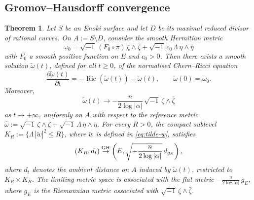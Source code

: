 \documentclass[12pt]{amsart}
\numberwithin{equation}{section}
\newtheorem{theorem}{Theorem}
\theoremstyle{remark}
\theoremstyle{definition}
\begin{document}
\subsection{Gromov--Hausdorff convergence}

\begin{theorem}\label{thm:crf-enoki}
Let $S$ be an Enoki surface and let $D$ be its maximal reduced divisor of rational curves. On $A:=S\setminus D$, consider the smooth Hermitian metric
$$ \omega_0 = \sqrt{-1}\,(F_0\circ\pi)\,\zeta\wedge\bar\zeta+\sqrt{-1}\,c_0\,\Lambda\,\eta\wedge\bar\eta $$
with $F_0$ a smooth positive function on $E$ and $c_0>0$. Then there exists a smooth solution $\tilde\omega(t)$, defined for all $t\geq0$, of the normalised Chern--Ricci equation
$$
\frac{\partial\tilde\omega(t)}{\partial t}
=
-\operatorname{Ric}(\tilde\omega(t))-\tilde\omega(t),
\qquad
\tilde\omega(0)=\omega_0.
$$
Moreover,
$$ \tilde\omega(t) \to -\frac{n}{2\log|\alpha|}\,\sqrt{-1}\,\zeta\wedge\bar\zeta $$
as $t\to+\infty$, uniformly on $A$ with respect to the reference metric $\hat\omega:=\sqrt{-1}\,\zeta\wedge\bar\zeta+\sqrt{-1}\,\Lambda\,\eta\wedge\bar\eta$. For every $R>0$, the compact sublevel $K_R:=\{\Lambda\,|\tilde w|^2 \leq R\}$, where $\tilde w$ is defined in \eqref{eq:tilde-w}, satisfies
$$ (K_R, d_t) \stackrel{\rm GH}{\to} \left(E, \sqrt{-\frac{n}{2\log|\alpha|}}\, d_{g_E}\right), $$
where $d_t$ denotes the ambient distance on $A$ induced by $\tilde\omega(t)$, restricted to $K_R\times K_R$. The limiting metric space is associated with the flat metric $-\frac{n}{2\log|\alpha|} \,g_E$, where $g_E$ is the Riemannian metric associated with $\sqrt{-1}\,\zeta\wedge\bar\zeta$.
\end{theorem}
\end{document}
